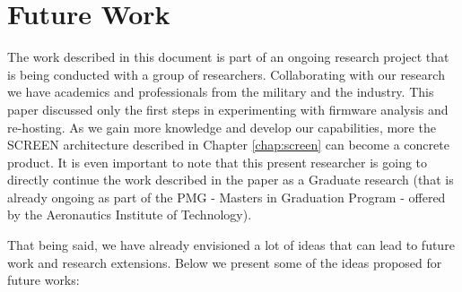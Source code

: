 \section{Future Work}
\label{sec:future-work}

The work described in this document is part of an ongoing research project that is being conducted with a group of researchers. Collaborating with our research we have academics and professionals from the military and the industry. This paper discussed only the first steps in experimenting with firmware analysis and re-hosting. As we gain more knowledge and develop our capabilities, more the SCREEN architecture described in Chapter \ref{chap:screen} can become a concrete product. It is even important to note that this present researcher is going to directly continue the work described in the paper as a Graduate research (that is already ongoing as part of the PMG - Masters in Graduation Program - offered by the Aeronautics Institute of Technology).

That being said, we have already envisioned a lot of ideas that can lead to future work and research extensions. Below we present some of the ideas proposed for future works:

